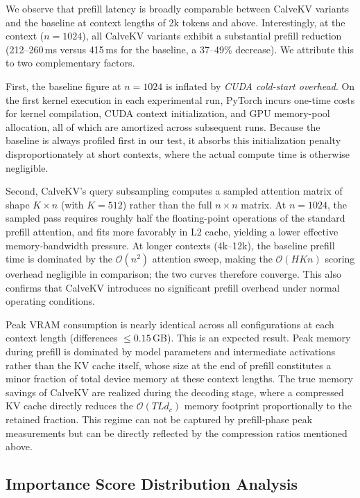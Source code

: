 \documentclass[letterpaper]{article} %
\begin{document}
We observe that prefill latency is broadly comparable between CalveKV variants and the baseline at
context lengths of 2k tokens and above. Interestingly, at the context
($n{=}1024$), all CalveKV variants exhibit a substantial prefill reduction
(212--260\,ms versus 415\,ms for the baseline, a 37--49\% decrease).
We attribute this to two complementary factors.

First, the baseline figure at $n{=}1024$ is inflated by \emph{CUDA cold-start
overhead}. On the first kernel execution in each experimental run, PyTorch
incurs one-time costs for kernel compilation, CUDA context initialization, and
GPU memory-pool allocation, all of which are amortized across subsequent runs.
Because the baseline is always profiled first in our test,
it absorbs this initialization penalty disproportionately at short contexts,
where the actual compute time is otherwise negligible.

Second, CalveKV's query subsampling computes a sampled attention matrix of
shape $K \times n$ (with $K{=}512$) rather than the full $n \times n$ matrix.
At $n{=}1024$, the sampled pass requires roughly half the floating-point
operations of the standard prefill attention, and fits more favorably in L2 cache,
yielding a lower effective memory-bandwidth pressure.
At longer contexts (4k--12k), the baseline prefill time is dominated by
the $\mathcal{O}(n^2)$ attention sweep, making the $\mathcal{O}(HKn)$ scoring
overhead negligible in comparison; the two curves therefore converge.
This also confirms that CalveKV introduces no significant prefill overhead
under normal operating conditions.


Peak VRAM consumption is nearly identical across all configurations at each context
length (differences $\leq 0.15$\,GB). This is an expected result. Peak memory during prefill
is dominated by model parameters and intermediate activations rather than the KV
cache itself, whose size at the end of prefill constitutes a minor fraction of total
device memory at these context lengths. The true memory savings of CalveKV are realized during 
the decoding stage, where a compressed KV cache directly
reduces the $\mathcal{O}(TL d_c)$ memory footprint proportionally to the retained
fraction. This regime can not be captured by prefill-phase peak measurements but can be directly
reflected by the compression ratios mentioned above.



\subsection{Importance Score Distribution Analysis}
\label{sec:exp_score_dist}
\end{document}
